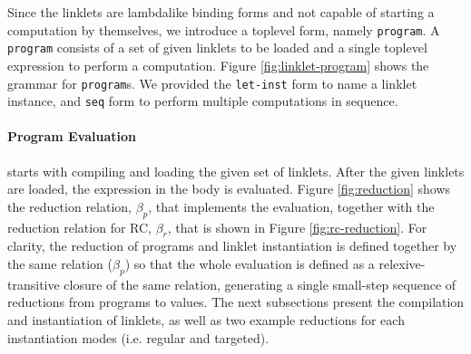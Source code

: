 Since the linklets are lambda\dash like binding forms and not capable
of starting a computation by themselves, we introduce a top\dash level
form, namely \verb|program|. A \verb|program| consists of a set of
given linklets to be loaded and a single top\dash level expression to
perform a computation. Figure \ref{fig:linklet-program} shows the
grammar for \verb|program|s. We provided the \verb|let-inst| form to
name a linklet instance, and \verb|seq| form to perform multiple
computations in sequence.

\paragraph{Program Evaluation} starts with compiling and loading the given
set of linklets. After the given linklets are loaded, the expression
in the body is evaluated. Figure \ref{fig:reduction} shows the
reduction relation, $\beta_p$, that implements the evaluation, together
with the reduction relation for RC, $\beta_r$, that is shown in Figure
\ref{fig:rc-reduction}. For clarity, the reduction of programs and
linklet instantiation is defined together by the same relation ($\beta_p$)
so that the whole evaluation is defined as a relexive-transitive
closure of the same relation, generating a single small-step sequence
of reductions from programs to values. The next subsections present
the compilation and instantiation of linklets, as well as two example
reductions for each instantiation modes (i.e. regular and targeted).

